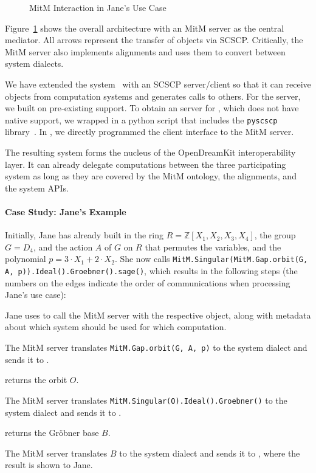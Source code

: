 \begin{figure}[ht]\centering
  \caption{MitM Interaction in Jane's Use Case}\label{fig:mitmpoc}
\end{figure}

Figure~\ref{fig:mitmpoc} shows the overall architecture with an MitM server as the central mediator.
All arrows represent the transfer of \OMMT objects via SCSCP.
Critically, the MitM server also implements alignments and uses them to convert between system dialects.

We have extended the \MMT system~\cite{Rabe:MAGMS13} with an SCSCP server/client so that it can receive objects from computation systems and generates calls to others.
For the \GAP server, we built on pre-existing \SCSCP support.
To obtain an \SCSCP server for \Singular, which does not have native \SCSCP support, we wrapped \Singular in a python script that includes the \lstinline|pyscscp| library~\cite{py-scscp:on}.
In \Sage, we directly programmed the client interface to the MitM server. 

The resulting system forms the nucleus of the OpenDreamKit interoperability layer. It can already delegate computations between the three participating system  as long as they are covered by the MitM ontology, the alignments, and the system APIs. 

\paragraph{Case Study: Jane's Example} 

Initially, Jane has already built in \Sage the ring $R=\mathbb{Z}[X_1,X_2,X_3,X_4]$, the group $G=D_4$, and the action $A$ of $G$ on $R$ that permutes the variables, and the polynomial $p = 3\cdot X_1 + 2\cdot X_2$.  She now calls \lstinline|MitM.Singular(MitM.Gap.orbit(G, A, p)).Ideal().Groebner().sage()|, which results in the following steps (the numbers on the edges indicate the order of communications when processing Jane's use case):
\begin{compactenum}
  \item Jane uses \Sage to call the MitM server with the respective \Sage object, along with metadata about which system should be used for which computation.
  \item The MitM server translates \lstinline|MitM.Gap.orbit(G, A, p)| to the \GAP system dialect and sends it to \GAP.
  \item \GAP returns the orbit $O$.
  \item The MitM server translates \lstinline|MitM.Singular(O).Ideal().Groebner()| to the \Singular system dialect and sends it to \Singular.
  \item \Singular returns the Gröbner base $B$.
  \item The MitM server translates $B$ to the \Sage system dialect and sends it to \Sage, where the result is shown to Jane.
\end{compactenum}

